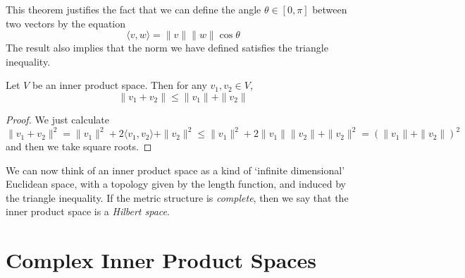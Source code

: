 This theorem justifies the fact that we can define the angle $\theta \in [0,\pi]$ between two vectors by the equation
%
\[ \langle v, w \rangle = \|v\| \|w\| \cos \theta \]
%
The result also implies that the norm we have defined satisfies the triangle inequality.

\begin{theorem}
    Let $V$ be an inner product space. Then for any $v_1,v_2 \in V$,
    \[ \| v_1 + v_2 \| \leq \| v_1 \| + \| v_2 \| \]
\end{theorem}
\begin{proof}
    We just calculate
    \[ \| v_1 + v_2 \|^2 = \| v_1 \|^2 + 2 \langle v_1, v_2 \rangle + \| v_2 \|^2 \leq \| v_1 \|^2 + 2 \|v_1\| \|v_2\| + \|v_2\|^2 = \left(\|v_1 \| + \|v_2\| \right)^2 \]
    and then we take square roots.
\end{proof}

We can now think of an inner product space as a kind of `infinite dimensional' Euclidean space, with a topology given by the length function, and induced by the triangle inequality. If the metric structure is {\it complete}, then we say that the inner product space is a \emph{Hilbert space}.

\section{Complex Inner Product Spaces}

